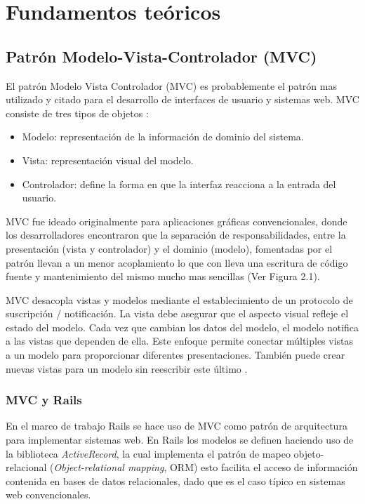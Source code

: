 \chapter{Fundamentos teóricos}

\section{Patrón Modelo-Vista-Controlador (MVC)}
El patrón Modelo Vista Controlador (MVC) es probablemente el patrón
mas utilizado y citado para el desarrollo de interfaces de usuario y sistemas web.
MVC consiste de tres tipos de objetos \cite{22_martin_fowler_mvc}:

\begin{itemize}
\item Modelo: representación de la información de dominio del sistema.
\item Vista: representación visual del modelo.
\item Controlador: define la forma en que la interfaz reacciona a la entrada
  del usuario.
\end{itemize}


MVC fue ideado originalmente para aplicaciones gráficas convencionales,
donde los desarrolladores encontraron que la separación de responsabilidades,
entre la presentación (vista y controlador) y el dominio (modelo), fomentadas
por el patrón llevan a un menor acoplamiento lo que con lleva una escritura
de código fuente y mantenimiento del mismo mucho mas sencillas (Ver Figura 2.1).

MVC desacopla vistas y modelos mediante el establecimiento de un
protocolo de suscripción / notificación. La vista debe asegurar que el
aspecto visual refleje el estado del modelo. Cada vez que cambian
los datos del modelo, el modelo notifica a las vistas que dependen de ella.
Este enfoque permite conectar múltiples vistas a un modelo para proporcionar
diferentes presentaciones. También puede crear nuevas vistas para un modelo
sin reescribir este último \cite{14_gamma_1995}.

\subsection{MVC y Rails}
En el marco de trabajo Rails se hace uso de MVC como patrón de arquitectura
para implementar sistemas web. En Rails los modelos se definen haciendo
uso de la biblioteca \textit{ActiveRecord}, la cual implementa el
patrón de mapeo objeto-relacional (\textit{Object-relational mapping},
ORM) esto facilita el acceso de información contenida en
bases de datos relacionales, dado que es el caso típico en sistemas web
convencionales.

